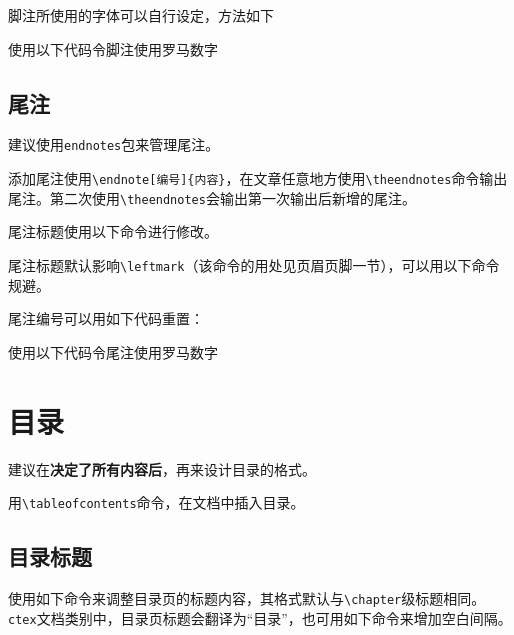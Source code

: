 \documentclass[10pt,openany]{book}
\begin{document}
脚注所使用的字体可以自行设定，方法如下



使用以下代码令脚注使用罗马数字



\section{尾注}

建议使用\texttt{endnotes}包来管理尾注。

添加尾注使用\texttt{\textbackslash{}endnote[编号]\{内容\}}，在文章任意地方使用\texttt{\textbackslash{}theendnotes}命令输出尾注。第二次使用\texttt{\textbackslash{}theendnotes}会输出第一次输出后新增的尾注。

尾注标题使用以下命令进行修改。



尾注标题默认影响\texttt{\textbackslash{}leftmark}（该命令的用处见页眉页脚一节），可以用以下命令规避。



尾注编号可以用如下代码重置：



使用以下代码令尾注使用罗马数字



\chapter{目录}

建议在\textbf{决定了所有内容后}，再来设计目录的格式。

用\texttt{\textbackslash{}tableofcontents}命令，在文档中插入目录。

\section{目录标题}

使用如下命令来调整目录页的标题内容，其格式默认与\texttt{\textbackslash{}chapter}级标题相同。\texttt{ctex}文档类别中，目录页标题会翻译为“目录”，也可用如下命令来增加空白间隔。


\end{document}
